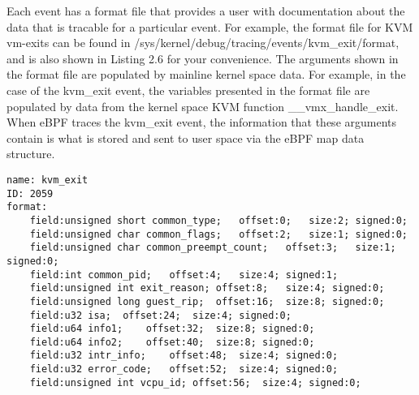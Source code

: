 \documentclass{report}
\begin{document}
\begin{spacing}{1.5}
{\large
Each event has a format file that provides a user with documentation about the data that is tracable for a particular event. For example, the format file for KVM vm-exits can be found in /sys/kernel/debug/tracing/events/kvm\_exit/format, and is also shown in Listing 2.6 for your convenience. The arguments shown in the format file are populated by mainline kernel space data. For example, in the case of the kvm\_exit event, the variables presented in the format file are populated by data from the kernel space KVM function \_\_vmx\_handle\_exit. When eBPF traces the kvm\_exit event, the information that these arguments contain is what is stored and sent to user space via the eBPF map data structure.
\newline

\leavevmode\newline

\begin{lstlisting}[caption={Format File for the kvm\_exit Linux Kernel Tracepoint Event | Linux kernel V5.18.8},captionpos=b]
name: kvm_exit
ID: 2059
format:
    field:unsigned short common_type;   offset:0;   size:2; signed:0;
    field:unsigned char common_flags;   offset:2;   size:1; signed:0;
    field:unsigned char common_preempt_count;   offset:3;   size:1; signed:0;
    field:int common_pid;   offset:4;   size:4; signed:1;
    field:unsigned int exit_reason; offset:8;   size:4; signed:0;
    field:unsigned long guest_rip;  offset:16;  size:8; signed:0;
    field:u32 isa;  offset:24;  size:4; signed:0;
    field:u64 info1;    offset:32;  size:8; signed:0;
    field:u64 info2;    offset:40;  size:8; signed:0;
    field:u32 intr_info;    offset:48;  size:4; signed:0;
    field:u32 error_code;   offset:52;  size:4; signed:0;
    field:unsigned int vcpu_id; offset:56;  size:4; signed:0;
\end{lstlisting}
}






\end{spacing}
\end{document}
